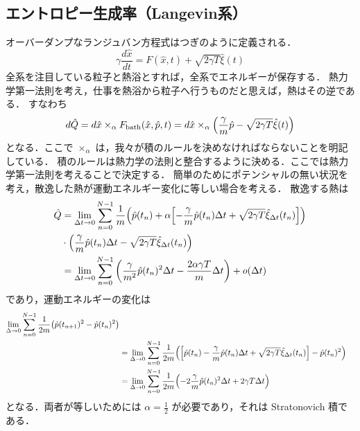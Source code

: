 \documentclass{jsarticle}
\numberwithin{equation}{section}
\theoremstyle{definition}
\begin{document}
\subsection{エントロピー生成率（Langevin系）}
オーバーダンプなランジュバン方程式はつぎのように定義される．
\begin{equation}
  \gamma \frac{d \hat{x}}{dt} = F(\hat{x}, t) + \sqrt{2 \gamma T} \hat{\xi }(t)
\end{equation}
全系を注目している粒子と熱浴とすれば，全系でエネルギーが保存する．
熱力学第一法則を考え，仕事を熱浴から粒子へ行うものだと思えば，熱はその逆である．
すなわち
\begin{equation}
  d \hat{Q} = d \hat{x} \times_{\alpha } F_{\text{bath}} (\hat{x}, \hat{p}, t) = d \hat{x} \times_{\alpha } \qty( \frac{\gamma}{m} \hat{p} - \sqrt{2 \gamma T} \hat{\xi }(t) )
\end{equation}
となる．ここで $\times_{\alpha }$ は，我々が積のルールを決めなければならないことを明記している．
積のルールは熱力学の法則と整合するように決める．ここでは熱力学第一法則を考えることで決定する．
簡単のためにポテンシャルの無い状況を考え，散逸した熱が運動エネルギー変化に等しい場合を考える．
散逸する熱は
\begin{align}
  \hat{Q} &= \lim_{\Delta t \to 0} \sum_{n=0}^{N-1} \frac{1}{m} \qty( \hat{p} (t_n) + \alpha \qty[ - \frac{\gamma }{m} \hat{p}(t_n) \Delta t + \sqrt{2 \gamma T} \hat{\xi }_{\Delta t} (t_n) ] ) \\ 
  & \cdot \qty( \frac{\gamma }{m} \hat{p}(t_n) \Delta t - \sqrt{2 \gamma T} \hat{\xi }_{\Delta t} (t_n) ) \\
  &= \lim_{\Delta t \to 0} \sum_{n=0}^{N-1} \qty( \frac{\gamma }{m^2} \hat{p}(t_n)^2 \Delta t - \frac{2 \alpha \gamma T}{m} \Delta t ) + o(\Delta t)
\end{align}
であり，運動エネルギーの変化は
\begin{align}
   \lim_{\Delta \to 0} \sum_{n=0}^{N-1} \frac{1}{2m} \qty( \hat{p}(t_{n+1})^2 - \hat{p}(t_n)^2 ) \\
  &= \lim_{\Delta \to 0} \sum_{n=0}^{N-1} \frac{1}{2m} \qty( \qty[ \hat{p}(t_{n}) - \frac{\gamma }{m} \hat{p}(t_n) \Delta t + \sqrt{2 \gamma T} \hat{\xi }_{\Delta t}(t_n)] - \hat{p}(t_n)^2) \\
  &= \lim_{\Delta \to 0} \sum_{n=0}^{N-1} \frac{1}{2m} \qty( -2 \frac{\gamma}{m} \hat{p}(t_n)^2 \Delta t + 2 \gamma T \Delta t )
\end{align}
となる．両者が等しいためには $\alpha = \frac{1}{2}$ が必要であり，それは Stratonovich 積である．
\end{document}
